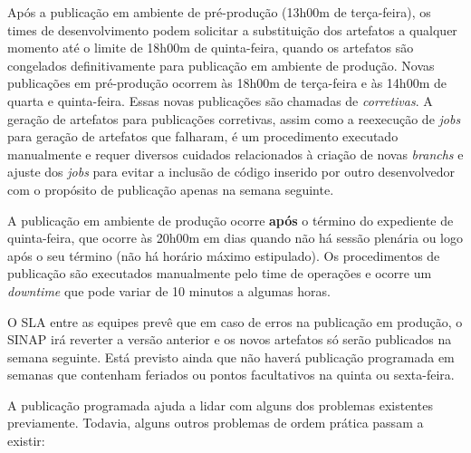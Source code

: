 Após a publicação em ambiente de pré-produção (13h00m de terça-feira), os times
de desenvolvimento podem solicitar a substituição dos artefatos a qualquer
momento até o limite de 18h00m de quinta-feira, quando os artefatos são
congelados definitivamente para publicação em ambiente de produção. Novas
publicações em pré-produção ocorrem às 18h00m de terça-feira e às 14h00m de
quarta e quinta-feira. Essas novas publicações são chamadas de \emph{corretivas}.
A geração de artefatos para publicações corretivas, assim como a reexecução
de \textit{jobs} para geração de artefatos que falharam, é um procedimento
executado manualmente e requer diversos cuidados relacionados à criação de novas
\textit{branchs} e ajuste dos \textit{jobs} para evitar a inclusão de código
inserido por outro desenvolvedor com o propósito de publicação apenas na semana
seguinte.

A publicação em ambiente de produção ocorre \textbf{após} o término do
expediente de quinta-feira, que ocorre às 20h00m em dias quando não há sessão
plenária ou logo após o seu término (não há horário máximo estipulado).
Os procedimentos de publicação são executados manualmente pelo time de
operações e ocorre um \textit{downtime} que pode variar de 10 minutos a algumas
horas.

O \acrshort{SLA} entre as equipes prevê que em caso de erros na publicação em
produção, o \acrshort{SINAP} irá reverter a versão anterior e os novos
artefatos só serão publicados na semana seguinte. Está previsto ainda que
não haverá publicação programada em semanas que contenham feriados ou pontos
facultativos na quinta ou sexta-feira.

A publicação programada ajuda a lidar com alguns dos problemas existentes
previamente. Todavia, alguns outros problemas de ordem prática passam a existir:

